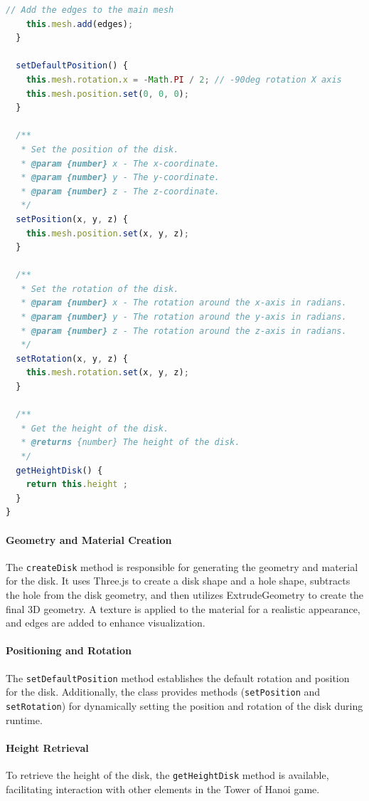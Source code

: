 \documentclass{article}
\begin{document}
\begin{lstlisting}[language=JavaScript, caption={JS Class for Disks}]
    // Add the edges to the main mesh
    this.mesh.add(edges);
  }

  setDefaultPosition() {
    this.mesh.rotation.x = -Math.PI / 2; // -90deg rotation X axis
    this.mesh.position.set(0, 0, 0);
  }

  /**
   * Set the position of the disk.
   * @param {number} x - The x-coordinate.
   * @param {number} y - The y-coordinate.
   * @param {number} z - The z-coordinate.
   */
  setPosition(x, y, z) {
    this.mesh.position.set(x, y, z);
  }

  /**
   * Set the rotation of the disk.
   * @param {number} x - The rotation around the x-axis in radians.
   * @param {number} y - The rotation around the y-axis in radians.
   * @param {number} z - The rotation around the z-axis in radians.
   */
  setRotation(x, y, z) {
    this.mesh.rotation.set(x, y, z);
  }

  /**
   * Get the height of the disk.
   * @returns {number} The height of the disk.
   */
  getHeightDisk() {
    return this.height ;
  }
}
\end{lstlisting}

\paragraph{Geometry and Material Creation}
The \texttt{createDisk} method is responsible for generating the geometry and material for the disk. It uses Three.js to create a disk shape and a hole shape, subtracts the hole from the disk geometry, and then utilizes ExtrudeGeometry to create the final 3D geometry. A texture is applied to the material for a realistic appearance, and edges are added to enhance visualization.

\paragraph{Positioning and Rotation}
The \texttt{setDefaultPosition} method establishes the default rotation and position for the disk. Additionally, the class provides methods (\texttt{setPosition} and \texttt{setRotation}) for dynamically setting the position and rotation of the disk during runtime.

\paragraph{Height Retrieval}
To retrieve the height of the disk, the \texttt{getHeightDisk} method is available, facilitating interaction with other elements in the Tower of Hanoi game.
\end{document}
